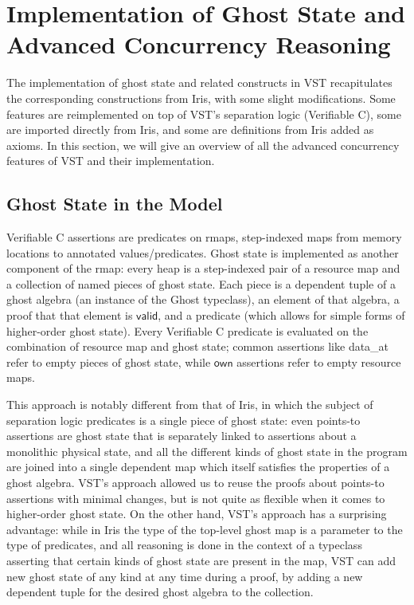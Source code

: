 \documentclass[11pt]{article} %
\begin{document}
\section{Implementation of Ghost State and Advanced Concurrency Reasoning}
The implementation of ghost state and related constructs in VST recapitulates the corresponding constructions from Iris, with some slight modifications. Some features are reimplemented on top of VST's separation logic (Verifiable C), some are imported directly from Iris, and some are definitions from Iris added as axioms. In this section, we will give an overview of all the advanced concurrency features of VST and their implementation.

\subsection{Ghost State in the Model}
Verifiable C assertions are predicates on \textsf{rmap}s, step-indexed maps from memory locations to annotated values/predicates. Ghost state is implemented as another component of the \textsf{rmap}: every heap is a step-indexed pair of a resource map and a collection of named pieces of ghost state. Each piece is a dependent tuple of a ghost algebra (an instance of the \textsf{Ghost} typeclass), an element of that algebra, a proof that that element is $\mathsf{valid}$, and a predicate (which allows for simple forms of higher-order ghost state). Every Verifiable C predicate is evaluated on the combination of resource map and ghost state; common assertions like \textsf{data\_at} refer to empty pieces of ghost state, while $\mathsf{own}$ assertions refer to empty resource maps.

This approach is notably different from that of Iris, in which the subject of separation logic predicates is a single piece of ghost state: even points-to assertions are ghost state that is separately linked to assertions about a monolithic physical state, and all the different kinds of ghost state in the program are joined into a single dependent map which itself satisfies the properties of a ghost algebra. VST's approach allowed us to reuse the proofs about points-to assertions with minimal changes, but is not quite as flexible when it comes to higher-order ghost state. On the other hand, VST's approach has a surprising advantage: while in Iris the type of the top-level ghost map is a parameter to the type of predicates, and all reasoning is done in the context of a typeclass asserting that certain kinds of ghost state are present in the map, VST can add new ghost state of any kind at any time during a proof, by adding a new dependent tuple for the desired ghost algebra to the collection.
\end{document}
